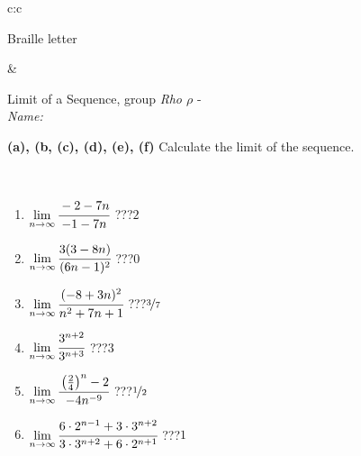 \documentclass[10pt]{report}
\begin{document}
\begin{tabular}{c:c}
\begin{minipage}[c][104.5mm][t]{0.5\linewidth}
\begin{center}
\begin{minipage}{0.20\linewidth}
\begin{center}
{\small Braille letter}
\end{center}
\end{minipage}
\end{center}
\end{minipage}
&
\begin{minipage}[c][104.5mm][t]{0.5\linewidth}
\begin{center}
\vspace{5mm}
{\huge Limit of a Sequence, group \textit{Rho $\rho$} -}\\[5mm]
\textit{Name:}\phantom{xxxxxxxxxxxxxxxxxxxxxxxxxxxxxxxxxxxxxxxxxxxxxxxxxxxxxxxxxxxxxxxxx}\\[5mm]
\begin{minipage}{0.95\linewidth}
\begin{center}
{
\textbf{(a), (b, (c), (d), (e), (f)} Calculate the limit of the sequence. \\[-1mm]
\phantom{x}
}
\end{center}
\end{minipage}
\\[1mm]
\begin{minipage}{0.79\linewidth}
\begin{center}
\begin{varwidth}{\linewidth}
\setlength{\itemsep}{0pt}
\begin{enumerate}
\normalsize
\item $\lim\limits_{n\to\infty}\cfrac{-2-7n}{-1-7n}$\quad \dotfill\; ???\;\dotfill \quad $2$
\item $\lim\limits_{n\to\infty}\cfrac{3(3-8n)}{(6n-1)^2}$\quad \dotfill\; ???\;\dotfill \quad $0$
\item $\lim\limits_{n\to\infty}\cfrac{(-8+3n)^2}{n^2+7n+1}$\quad \dotfill\; ???\;\dotfill \quad $\nicefrac{3}{7}$
\item $\lim\limits_{n\to\infty}\cfrac{3^{n+2}}{3^{n+3}}$\quad \dotfill\; ???\;\dotfill \quad $3$
\item $\lim\limits_{n\to\infty}\cfrac{\left(\frac{2}{4}\right)^n -2}{-4n^{-9}}$\quad \dotfill\; ???\;\dotfill \quad $\nicefrac{1}{2}$
\item $\lim\limits_{n\to\infty}\cfrac{6\cdot 2^{n-1}+3\cdot 3^{n+2}}{3\cdot 3^{n+2}+6\cdot 2^{n+1}}$\quad \dotfill\; ???\;\dotfill \quad $1$
\end{enumerate}
\end{varwidth}
\end{center}
\end{minipage}
\begin{minipage}{0.20\linewidth}

\end{minipage}
\end{center}
\end{minipage}
\end{tabular}
\end{document}

